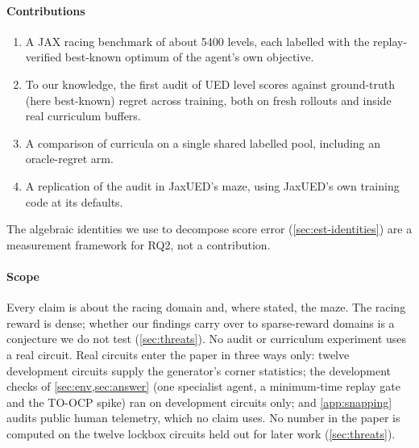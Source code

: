 \paragraph{Contributions}
\begin{enumerate}
  \item A JAX racing benchmark of about \num{5400} levels, each labelled with the
        replay-verified best-known optimum of the agent's own objective.
  \item To our knowledge, the first audit of UED level scores against ground-truth (here
        best-known) regret across training, both on fresh rollouts and inside real
        curriculum buffers.
  \item A comparison of curricula on a single shared labelled pool, including an
        oracle-regret arm.
  \item A replication of the audit in JaxUED's maze, using JaxUED's own training code at
        its defaults.
\end{enumerate}
The algebraic identities we use to decompose score error (\cref{sec:est-identities}) are
a measurement framework for RQ2, not a contribution.

\paragraph{Scope} Every claim is about the racing domain and, where stated, the maze. The
racing reward is dense; whether our findings carry over to sparse-reward domains is a
conjecture we do not test (\cref{sec:threats}). No audit or curriculum experiment uses a
real circuit. Real circuits enter the paper in three ways only: twelve development
circuits supply the generator's corner statistics; the development checks of
\cref{sec:env,sec:answer} (one specialist agent, a minimum-time replay gate and the
TO-OCP spike) ran on development circuits only; and \cref{app:snapping} audits public
human telemetry, which no claim uses. No number in the paper is computed on the twelve
lockbox circuits held out for later work (\cref{sec:threats}).
